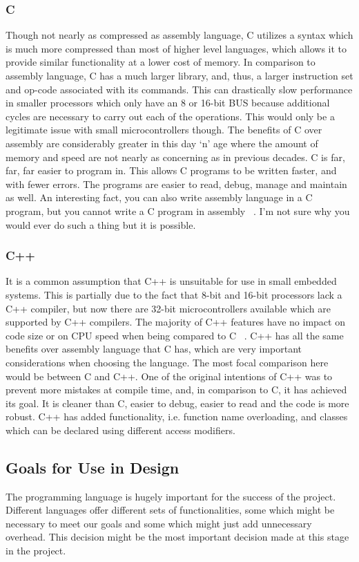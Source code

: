 \documentclass[10pt,letterpaper,onecolumn,journal]{IEEEtran}
\begin{document}
\subsubsection{C}
Though not nearly as compressed as assembly language, C utilizes a syntax which is much more compressed than most of higher level languages, which allows it to provide similar functionality at a lower cost of memory. In comparison to assembly language, C has a much larger library, and, thus, a larger instruction set and op-code associated with its commands. This can drastically slow performance in smaller processors which only have an 8 or 16-bit BUS because additional cycles are necessary to carry out each of the operations. This would only be a legitimate issue with small microcontrollers though. The benefits of C over assembly are considerably greater in this day ‘n’ age where the amount of memory and speed are not nearly as concerning as in previous decades. C is far, far, far easier to program in. This allows C programs to be written faster, and with fewer errors. The programs are easier to read, debug, manage and maintain as well. An interesting fact, you can also write assembly language in a C program, but you cannot write a C program in assembly ~\cite{codeproject}. I’m not sure why you would ever do such a thing but it is possible. 
\subsubsection{C++}
It is a common assumption that C++ is unsuitable for use in small embedded systems. This is partially due to the fact that 8-bit and 16-bit processors lack a C++ compiler, but now there are 32-bit microcontrollers available which are supported by C++ compilers. The majority of C++ features have no impact on code size or on CPU speed when being compared to C ~\cite{herity2015}. C++ has all the same benefits over assembly language that C has, which are very important considerations when choosing the language. The most focal comparison here would be between C and C++. One of the original intentions of C++ was to prevent more mistakes at compile time, and, in comparison to C, it has achieved its goal. It is cleaner than C, easier to debug, easier to read and the code is more robust. C++ has added functionality, i.e. function name overloading, and classes which can be declared using different access modifiers.
\subsection{Goals for Use in Design}
The programming language is hugely important for the success of the project. Different languages offer different sets of functionalities, some which might be necessary to meet our goals and some which might just add unnecessary overhead. This decision might be the most important decision made at this stage in the project.
\end{document}
